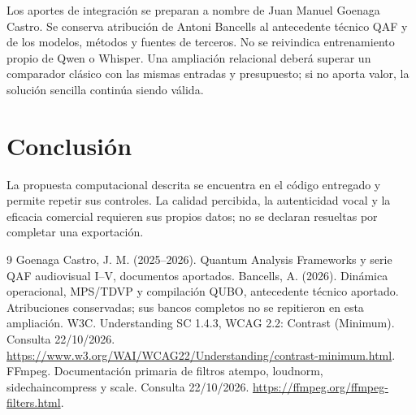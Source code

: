 \documentclass[10pt,a4paper]{article}
\begin{document}
Los aportes de integración se preparan a nombre de Juan Manuel Goenaga Castro. Se conserva atribución de Antoni Bancells al antecedente técnico QAF y de los modelos, métodos y fuentes de terceros. No se reivindica entrenamiento propio de Qwen o Whisper. Una ampliación relacional deberá superar un comparador clásico con las mismas entradas y presupuesto; si no aporta valor, la solución sencilla continúa siendo válida.
\section{Conclusión}
La propuesta computacional descrita se encuentra en el código entregado y permite repetir sus controles. La calidad percibida, la autenticidad vocal y la eficacia comercial requieren sus propios datos; no se declaran resueltas por completar una exportación.
\begin{thebibliography}{9}
 Goenaga Castro, J. M. (2025--2026). Quantum Analysis Frameworks y serie QAF audiovisual I--V, documentos aportados. Bancells, A. (2026). Dinámica operacional, MPS/TDVP y compilación QUBO, antecedente técnico aportado. Atribuciones conservadas; sus bancos completos no se repitieron en esta ampliación.
 W3C. Understanding SC 1.4.3, WCAG 2.2: Contrast (Minimum). Consulta 22/10/2026. \url{https://www.w3.org/WAI/WCAG22/Understanding/contrast-minimum.html}.
 FFmpeg. Documentación primaria de filtros atempo, loudnorm, sidechaincompress y scale. Consulta 22/10/2026. \url{https://ffmpeg.org/ffmpeg-filters.html}.
\end{thebibliography}
\end{document}
